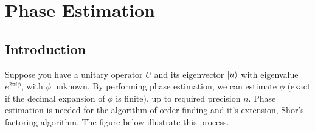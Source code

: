 \documentclass{article}
\begin{document}
\pagebreak

\section{Phase Estimation}
\vspace{5mm}

\subsection{Introduction}
Suppose you have a unitary operator $U$ and its eigenvector $\ket{u}$ with eigenvalue $e^{2\pi i \phi}$, with $\phi$ unknown. By performing phase estimation, we can estimate $\phi$ (exact if the decimal expansion of $\phi$ is finite), up to required precision $n$. Phase estimation is needed for the algorithm of order-finding and it's extension, Shor's factoring algorithm. The figure below illustrate this process.
\end{document}
